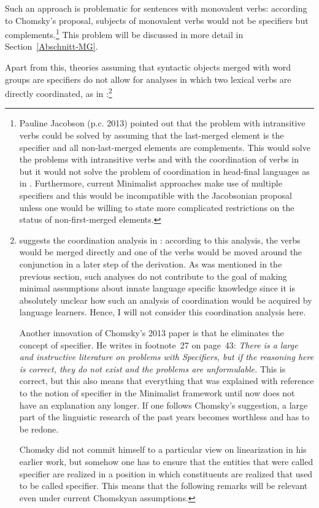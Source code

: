Such an approach is problematic for sentences with monovalent verbs: according to Chomsky's
proposal, subjects of monovalent verbs would not be specifiers but complements.\footnote{%
  Pauline Jacobson (p.c. 2013) pointed out that the problem with intransitive verbs could be solved by assuming
  that the last-merged element is the specifier and all non-last-merged elements are
  complements. This would solve the problems with intransitive verbs and with the coordination of
  verbs in  but it would not solve the problem of
  coordination in head-final languages as in . Furthermore, current Minimalist approaches make use of
  multiple specifiers and this would be incompatible with the Jacobsonian proposal unless one would
  be willing to state more complicated restrictions on the status of non-first-merged elements.%
}
This problem will be discussed in more detail in Section~\ref{Abschnitt-MG}.\pagebreak

Apart from this, theories assuming that syntactic objects merged with word groups are specifiers do
not allow for analyses in which two lexical verbs are directly coordinated, as in :\footnote{\label{fn-Chomsky-on-Specifiers}%
  \citet[]{Chomsky2013a} suggests the coordination analysis in
  : according to this analysis, the verbs would
  be merged directly and one of the verbs would be moved around the conjunction in a later step of
  the derivation. As was mentioned in the previous section, such analyses do not contribute to the
  goal of making minimal assumptions about innate language specific knowledge since it is absolutely
  unclear how such an analysis of coordination would be acquired by language learners. Hence, I will
  not consider this coordination analysis here.

  Another innovation of Chomsky's 2013 paper is that he eliminates the concept of specifier. He
    writes in footnote~27 on page~43: \emph{There is a large and instructive literature on problems with
    Specifiers, but if the reasoning here is correct, they do not exist and the problems are
    unformulable.} This is correct, but this also means that everything that was explained with
    reference to the notion of specifier in the Minimalist framework until now does not have an explanation any longer.
    If one follows Chomsky's suggestion, a large part of the linguistic research of the past years
    becomes worthless and has to be redone.

    Chomsky did not commit himself to a particular view on linearization in his earlier work, but
  somehow one has to ensure that the entities that were called specifier are realized in a position
  in which constituents are realized that used to be called specifier. This means that the following
  remarks will be relevant even under current Chomskyan assumptions.
}

